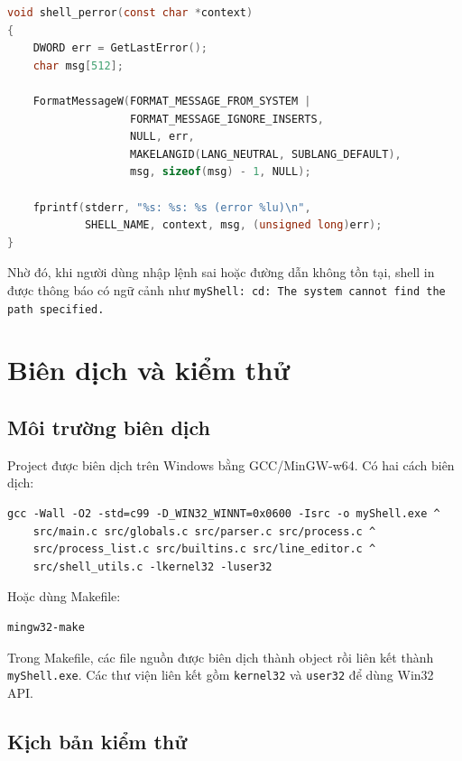 \documentclass[13pt,a4paper,oneside]{extreport}
\begin{document}
\begin{lstlisting}[language=C,caption={Hàm báo lỗi dùng FormatMessageW}]
void shell_perror(const char *context)
{
    DWORD err = GetLastError();
    char msg[512];

    FormatMessageW(FORMAT_MESSAGE_FROM_SYSTEM |
                   FORMAT_MESSAGE_IGNORE_INSERTS,
                   NULL, err,
                   MAKELANGID(LANG_NEUTRAL, SUBLANG_DEFAULT),
                   msg, sizeof(msg) - 1, NULL);

    fprintf(stderr, "%s: %s: %s (error %lu)\n",
            SHELL_NAME, context, msg, (unsigned long)err);
}
\end{lstlisting}

Nhờ đó, khi người dùng nhập lệnh sai hoặc đường dẫn không tồn tại, shell in được thông báo có ngữ cảnh như \texttt{myShell: cd: The system cannot find the path specified.}

\chapter{Biên dịch và kiểm thử}

\section{Môi trường biên dịch}

Project được biên dịch trên Windows bằng GCC/MinGW-w64. Có hai cách biên dịch:

\begin{lstlisting}[language={},caption={Biên dịch trực tiếp bằng gcc}]
gcc -Wall -O2 -std=c99 -D_WIN32_WINNT=0x0600 -Isrc -o myShell.exe ^
    src/main.c src/globals.c src/parser.c src/process.c ^
    src/process_list.c src/builtins.c src/line_editor.c ^
    src/shell_utils.c -lkernel32 -luser32
\end{lstlisting}

Hoặc dùng Makefile:

\begin{lstlisting}[language={},caption={Biên dịch bằng Makefile}]
mingw32-make
\end{lstlisting}

Trong Makefile, các file nguồn được biên dịch thành object rồi liên kết thành \texttt{myShell.exe}. Các thư viện liên kết gồm \texttt{kernel32} và \texttt{user32} để dùng Win32 API.

\section{Kịch bản kiểm thử}
\end{document}
